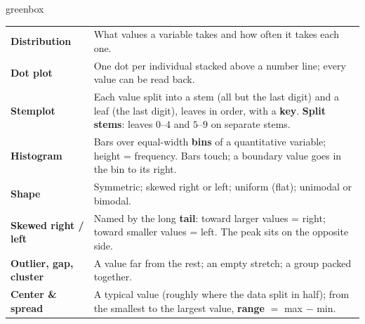 \documentclass[10pt]{article}
\begin{document}
\boxguard[24]
\begin{skillbox}{greenbox}
\small
\renewcommand{\arraystretch}{1.35}
\begin{tabularx}{\linewidth}{@{} >{\bfseries}p{3.1cm} X @{}}
Distribution & What values a variable takes and how often it takes each one. \\
Dot plot & One dot per individual stacked above a number line; every value can be read back. \\
Stemplot & Each value split into a stem (all but the last digit) and a leaf (the last digit), leaves
       in order, with a \textbf{key}. \textbf{Split stems}: leaves $0$--$4$ and $5$--$9$ on separate
       stems. \\
Histogram & Bars over equal-width \textbf{bins} of a quantitative variable; height = frequency.
       Bars touch; a boundary value goes in the bin to its right. \\
Shape & Symmetric; skewed right or left; uniform (flat); unimodal or bimodal. \\
Skewed right / left & Named by the long \textbf{tail}: toward larger values = right; toward
       smaller values = left. The peak sits on the opposite side. \\
Outlier, gap, cluster & A value far from the rest; an empty stretch; a group packed together. \\
Center \& spread & A typical value (roughly where the data split in half); from the smallest to
       the largest value, \textbf{range} $=$ max $-$ min. \\
\end{tabularx}
\end{skillbox}
\end{document}
